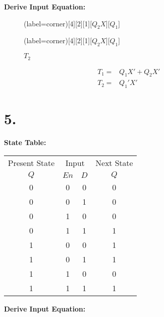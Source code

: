 \documentclass[a4paper,12pt]{article}
\begin{document}
\newpage
\textbf{Derive Input Equation:}

\begin{figure}[H]
	\begin{minipage}{0.5\linewidth}
		\centering
		\begin{karnaugh-map}(label=corner)[4][2][1][$Q_2X$][$Q_1$]
			\autoterms[X]
		\end{karnaugh-map}
		\caption*{$T_1$}
	\end{minipage}
	\begin{minipage}{0.5\linewidth}
		\centering
		\begin{karnaugh-map}(label=corner)[4][2][1][$Q_2X$][$Q_1$]
			\autoterms[X]
		\end{karnaugh-map}
		\caption*{$T_2$}
	\end{minipage}
\end{figure}

\begin{align*}
	T_1 =& Q_1X' + Q_2X' \\
	T_2 =& Q_1'X'
\end{align*}

\section*{5.}

\textbf{State Table:}

\begin{center}
	\begin{tabular}{cccc}
		\toprule
		Present State & \multicolumn{2}{c}{Input} & Next State \\
		\cmidrule(lr){1-1} \cmidrule(lr){2-3} \cmidrule(lr){4-4}
		$Q$ & $En$ & $D$ & $Q$ \\
		\midrule
		0 & 0 & 0 & 0 \\
		0 & 0 & 1 & 0 \\
		0 & 1 & 0 & 0 \\
		0 & 1 & 1 & 1 \\
		1 & 0 & 0 & 1 \\
		1 & 0 & 1 & 1 \\
		1 & 1 & 0 & 0 \\
		1 & 1 & 1 & 1 \\
		\bottomrule
	\end{tabular}
\end{center}

\textbf{Derive Input Equation:}
\end{document}
